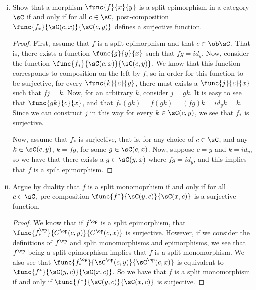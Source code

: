 \documentclass[main.tex]{subfiles}
\begin{document}
\paragraph{}
\begin{exercise}\leavevmode
	\begin{enumerate}[(i)]
	\item Show that a morphism \( \func{f}{x}{y} \) is a split epimorphism
		in a category \( \sC \) if and only if for all \( c\in \sC,\)
		post-composition \( \func{f_*}{\sC(c,x)}{\sC(c,y)} \) defines a
		surjective function.
	\begin{proof}
		 First, assume that \(f\) is a split epimorphism and that \(c \in
		 \ob\sC\). That is, there exists a function \(\func{g}{y}{x}\) such that
		 \(fg = id_y\). Now, consider the function
		 \(\func{f_*}{\sC(c,x)}{\sC(c,y)}.\) We know that this function
		 corresponds to composition on the left by \(f\), so in order for this
		 function to be surjective, for every \(\func{k}{c}{y}\), there must
		 exists a \(\func{j}{c}{x}\) such that \(fj = k\). Now, for an arbitrary
		 \(k\), consider \(j = gk\). It is easy to see that \(\func{gk}{c}{x}\),
		 and that \(f_*(gk) = f(gk) = (fg)k = id_yk = k\). Since we can construct
		 \(j\) in this way for every \(k \in \sC(c,y)\), we see that \(f_*\)
		 is surjective.

		Now, assume that \(f_*\) is surjective, that is, for any choice of \(c
		\in \sC\),  and any \(k \in \sC(c,y)\), \(k = fg\), for some \(g \in
		\sC(c,x)\). Now, suppose \(c = y\) and \(k = id_y\), so we have that
		there exists a \(g \in \sC(y,x)\) where \(fg = id_y\), and this implies
		that \(f\) is a spilt epimorphism.
	\end{proof}

	\item Argue by duality that \(f\) is a split monomoprhism if and
		only if for all \(c\in\sC,\) pre-composition
		\(\func{f^*}{\sC(y,c)}{\sC(x,c)}\) is a surjective function.
	\begin{proof}
		We know that if \(f^{\op}\) is a split epimorphism, that
		\(\func{f_{*}^{\op}}{C^{\op}(c,y)}{C^{\op}(c,x)}\) is surjective.
		However, if we consider the definitions of \(f^{\op}\) and split
		monomorphisms and epimorphisms, we see that \(f^{\op}\) being a split
		epimorphism implies that \(f\) is a split monomorphism. We also see that
		\(\func{f_{*}^{\op}}{\sC^{\op}(c,y)}{\sC^{\op}(c,x)}\) is equivalent to
		\(\func{f^{*}}{\sC(y,c)}{\sC(x,c)}.\) So we have that \(f\) is a split
		monomorphism if and only if \(\func{f^{*}}{\sC(y,c)}{\sC(x,c)}\) is
		surjective.
	\end{proof}
\end{enumerate}
\end{exercise}
\end{document}
